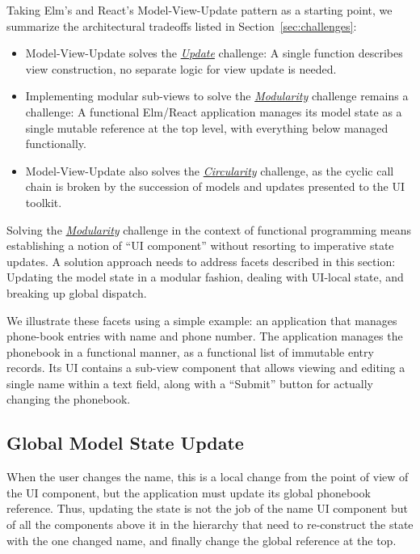 \documentclass[sigplan,screen]{acmart}
\begin{document}
Taking Elm's and React's Model-View-Update pattern as a starting
point, we summarize the architectural tradeoffs listed in
Section~\ref{sec:challenges}:
%
\begin{itemize}
\item Model-View-Update solves the \hyperlink{challenge:update}{\textit{Update}} challenge: A single function
  describes view construction, no separate logic for view update is
  needed.
\item Implementing modular sub-views to solve the \hyperlink{challenge:modularity}{\textit{Modularity}} challenge remains a challenge:
  A functional Elm/React application manages its model
  state as a single mutable reference at the top level, with
  everything below managed functionally.
\item Model-View-Update also solves the \hyperlink{challenge:circularity}{\textit{Circularity}} challenge, as the cyclic call
  chain is broken by the succession of models and updates
  presented to the UI toolkit.
\end{itemize}
%
Solving the \hyperlink{challenge:modularity}{\textit{Modularity}} challenge in the context of functional programming
means establishing a notion of ``UI
component'' without resorting to imperative state updates.  A solution
approach needs to address facets described in this section: Updating
the model state in a modular fashion, dealing with UI-local state, and
breaking up global dispatch.

We illustrate these facets using a simple example: an
application that manages phone-book entries with name and phone
number.  The application manages the phonebook in a functional
manner, as a functional list of immutable entry records.  Its UI
contains a sub-view component that allows viewing and editing a single
name within a text field, along with a ``Submit'' button for actually
changing the phonebook.


\subsection{Global Model State Update}

When the user changes the name, this is a local change from the point
of view of the UI component, but 
the application must update its global phonebook reference.  Thus,
updating the state is not the job of the name UI component
but of all the components above it in the hierarchy that need to
re-construct the state with the one changed name, and finally change
the global reference at the top.
\end{document}
